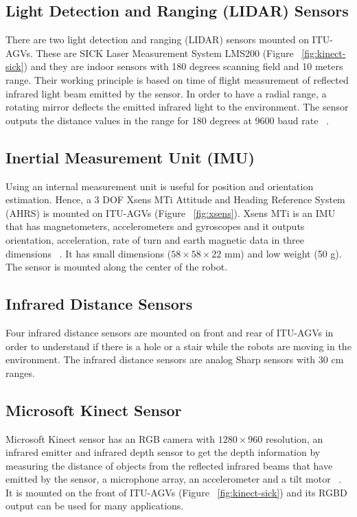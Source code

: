 \subsection{Light Detection and Ranging (LIDAR) Sensors}
\label{subsec:lidar}
There are two light detection and ranging (LIDAR) sensors mounted on ITU-AGVs. These are SICK Laser Measurement System LMS200 (Figure ~\ref{fig:kinect-sick}) and they are indoor sensors with 180 degrees scanning field and 10 meters range. Their working principle is based on time of flight measurement of reflected infrared light beam emitted by the sensor. In order to have a radial range, a rotating mirror deflects the emitted infrared light to the environment. The sensor outputs the distance values in the range for 180 degrees at 9600 baud rate ~\cite{sickDatasheet}.

\subsection{Inertial Measurement Unit (IMU)}
\label{subsec:imu}
Using an internal measurement unit is useful for position and orientation estimation. Hence, a 3 DOF Xsens MTi Attitude and Heading Reference System (AHRS) is mounted on ITU-AGVs (Figure ~\ref{fig:xsens}). Xsens MTi is an IMU that has magnetometers, accelerometers and gyroscopes and it outputs orientation, acceleration, rate of turn and earth magnetic data in three dimensions ~\cite{xsensDatasheet}. It has small dimensions ($58\times58\times22$ mm) and low weight (50 g). The sensor is mounted along the center of the robot. 

\subsection{Infrared Distance Sensors}
\label{subsec:infrared sensors}
Four infrared distance sensors are mounted on front and rear of ITU-AGVs in order to understand if there is a hole or a stair while the robots are moving in the environment. The infrared distance sensors are analog Sharp sensors with 30 cm ranges. 

\subsection{Microsoft Kinect Sensor}
\label{subsec:kinect}
Microsoft Kinect sensor has an RGB camera with $1280\times960$ resolution, an infrared emitter and infrared depth sensor to get the depth information by measuring the distance of objects from the reflected infrared beams that have emitted by the sensor, a microphone array, an accelerometer and a tilt motor ~\cite{kinectSpecs}. It is mounted on the front of ITU-AGVs (Figure ~\ref{fig:kinect-sick}) and its RGBD output can be used for many applications. 


